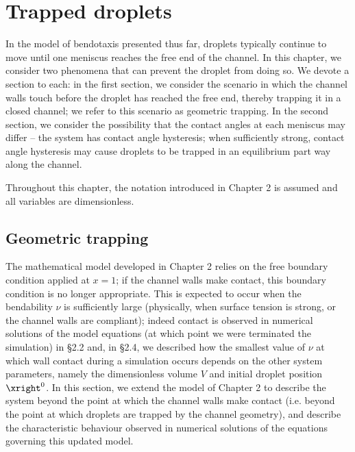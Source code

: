 \graphicspath{{./Sections/Chapter4_finalstates/figures/}}
\chapter{Trapped droplets}

In the model of bendotaxis presented thus far, droplets typically continue to move until one meniscus reaches the free end of the channel. In this chapter, we consider two phenomena that can prevent the droplet from doing so. We devote a section to each: in the first section, we consider the scenario in which the channel walls touch before the droplet has reached the free end, thereby trapping it in a closed channel; we refer to this scenario as geometric trapping. In the second section, we consider the possibility that the contact angles at each meniscus may differ -- the system has contact angle hysteresis; when sufficiently strong, contact angle hysteresis may cause droplets to be trapped in an equilibrium part way along the channel.

Throughout this chapter, the notation introduced in Chapter 2 is assumed and all variables are dimensionless.

\section{Geometric trapping}\label{S:Ch4:Geometric}
The mathematical model developed in Chapter 2 relies on the free boundary condition applied at $x = 1$; if the channel walls make contact, this boundary condition is no longer appropriate. This is expected to occur when the bendability $\nu$ is sufficiently large (physically, when surface tension is strong, or the channel walls are compliant); indeed contact is observed in numerical solutions of the model equations (at which point we were terminated the simulation) in \S2.2 and, in \S2.4, we described  how the smallest value of $\nu$ at which wall contact during a simulation occurs depends on the other system parameters, namely the dimensionless volume $V$ and initial droplet position $\xright^0$. In this section, we extend the model of Chapter 2 to describe the system beyond the point at which the channel walls make contact (i.e. beyond the point at which droplets are trapped by the channel geometry), and describe the characteristic behaviour observed in numerical solutions of the equations governing this updated model.

